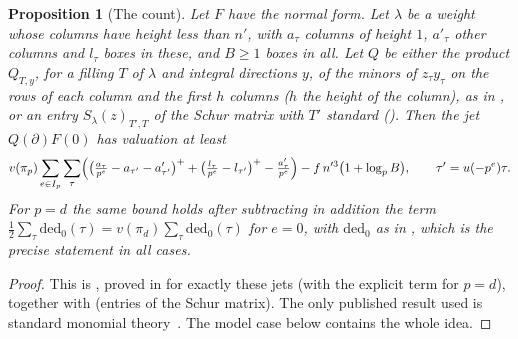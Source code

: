 \documentclass[10pt]{amsart}
\newtheorem{proposition}[theorem]{Proposition}
\theoremstyle{definition}
\theoremstyle{remark}
\begin{document}
\begin{proposition}[The count]\label{au:count}
Let $F$ have the normal form. Let $\lambda$ be a weight whose columns have height less than $n'$, with $a_\tau$ columns of
height $1$, $a'_\tau$ other columns and $l_\tau$ boxes in these, and $B\ge1$ boxes in all. Let $Q$ be either
the product $Q_{T,y}$, for a filling $T$ of $\lambda$ and integral directions $y$, of the minors of
$z_\tau y_\tau$ on the rows of each column and the first $h$ columns ($h$ the height of the column),
as in {\cite[Proposition~4.1]{P49}}, or an entry $S_\lambda(z)_{T',T}$ of the Schur matrix with $T'$
standard ({\cite[Lemma~4.4]{P49}}). Then the jet
$Q(\partial)F(0)$ has valuation at least
\[
v(\pi_p)\sum_{e\in I_p}\sum_{\tau}\Bigl(\bigl(\tfrac{a_\tau}{p^e}-a_{\tau'}-a'_{\tau'}\bigr)^+
+\bigl(\tfrac{l_\tau}{p^e}-l_{\tau'}\bigr)^+-\tfrac{a'_\tau}{p^e}\Bigr)-f\,n'^3\bigl(1+\log_p
B\bigr),\qquad\tau'=u(-p^e)\tau.
\]
For $p=d$ the same bound holds after subtracting in
addition the term $\tfrac12\sum_\tau\mathrm{ded}_0(\tau)=v(\pi_d)\sum_\tau\mathrm{ded}_0(\tau)$ for $e=0$, with
$\mathrm{ded}_0$ as in {\cite[Proposition~4.1]{P49}}, which is the precise statement in all cases.
\end{proposition}
\begin{proof}
This is {\cite[Proposition~4.1]{P49}}, proved in {\cite[\S4.2]{P49}} for exactly these jets
(with the explicit term for $p=d$), together with {\cite[Lemma~4.4]{P49}} (entries of the Schur matrix). The only published
result used is standard monomial theory~\cite{DEP}. The model case below contains the whole idea.
\end{proof}
\end{document}
